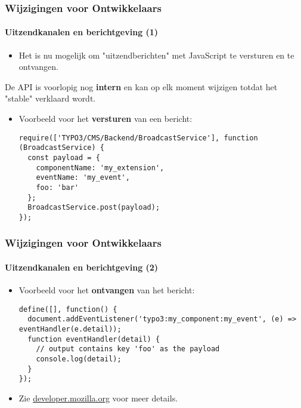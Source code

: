 \begin{frame}[fragile]
	\frametitle{Wijzigingen voor Ontwikkelaars}
	\framesubtitle{Uitzendkanalen en berichtgeving (1)}

	\lstset{basicstyle=\tiny\ttfamily}

	\begin{itemize}
		\item Het is nu mogelijk om "uitzendberichten" met JavaScript te versturen en te ontvangen.
	\end{itemize}

	\vspace{-0.2cm}
	\begingroup
		\color{red}
			\begin{center}
				De API is voorlopig nog \textbf{intern}\newline
				en kan op elk moment wijzigen totdat het "stable" verklaard wordt.
			\end{center}
	\endgroup

	\begin{itemize}
		\item Voorbeeld voor het \textbf{versturen} van een bericht:

\begin{lstlisting}
require(['TYPO3/CMS/Backend/BroadcastService'], function (BroadcastService) {
  const payload = {
    componentName: 'my_extension',
    eventName: 'my_event',
    foo: 'bar'
  };
  BroadcastService.post(payload);
});
\end{lstlisting}

	\end{itemize}

\end{frame}


\begin{frame}[fragile]
	\frametitle{Wijzigingen voor Ontwikkelaars}
	\framesubtitle{Uitzendkanalen en berichtgeving (2)}

	\lstset{basicstyle=\tiny\ttfamily}

	\begin{itemize}
		\item Voorbeeld voor het \textbf{ontvangen} van het bericht:

\begin{lstlisting}
define([], function() {
  document.addEventListener('typo3:my_component:my_event', (e) => eventHandler(e.detail));
  function eventHandler(detail) {
    // output contains key 'foo' as the payload
    console.log(detail);
  }
});
\end{lstlisting}

		\item Zie \href{https://developer.mozilla.org/en-US/docs/Web/API/Broadcast_Channel_API}{developer.mozilla.org} voor meer details.

	\end{itemize}

\end{frame}


